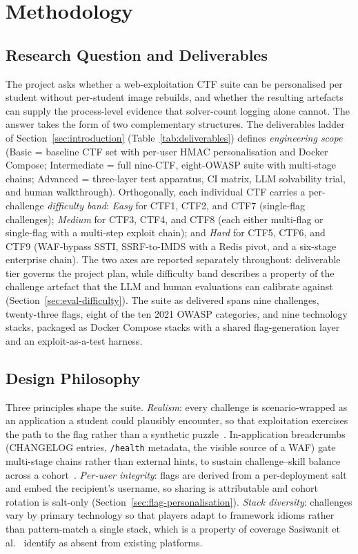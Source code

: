 \section{Methodology}
\label{sec:methodology}

\subsection{Research Question and Deliverables}
\label{sec:research-question}

The project asks whether a web-exploitation CTF suite can be
personalised per student without per-student image rebuilds,
and whether the resulting artefacts can supply the
process-level evidence that solver-count logging alone cannot.
The answer takes the form of two complementary structures.
The deliverables ladder of
Section~\ref{sec:introduction} (Table~\ref{tab:deliverables})
defines \emph{engineering
scope} (Basic = baseline CTF set with per-user HMAC
personalisation and Docker Compose; Intermediate = full
nine-CTF, eight-OWASP suite with multi-stage chains;
Advanced = three-layer test apparatus, CI matrix, LLM
solvability trial, and human walkthrough). Orthogonally,
each individual CTF carries a per-challenge
\emph{difficulty band}: \textit{Easy} for CTF1, CTF2, and
CTF7 (single-flag challenges); \textit{Medium} for CTF3,
CTF4, and CTF8 (each either multi-flag or single-flag with a
multi-step exploit chain); and
\textit{Hard} for CTF5, CTF6, and CTF9 (WAF-bypass SSTI,
SSRF-to-IMDS with a Redis pivot, and a six-stage enterprise
chain). The two axes are reported separately throughout:
deliverable tier governs the project plan, while difficulty
band describes a property of the challenge artefact that the
LLM and human evaluations can calibrate against
(Section~\ref{sec:eval-difficulty}). The suite as delivered
spans nine challenges, twenty-three flags, eight of the ten
2021 OWASP categories, and nine technology stacks, packaged
as Docker Compose stacks with a shared flag-generation layer
and an exploit-as-a-test harness.

\subsection{Design Philosophy}
\label{sec:design-philosophy}

Three principles shape the suite.
\textit{Realism}: every challenge is scenario-wrapped as an
application a student could plausibly encounter, so that
exploitation exercises the path to the flag rather than a
synthetic puzzle~\cite{Fuzyll2015,Vykopal}. In-application
breadcrumbs (CHANGELOG entries, \texttt{/health} metadata, the
visible source of a WAF) gate multi-stage chains rather than
external hints, to sustain challenge--skill balance across a
cohort~\cite{Csikszentmihalyi,Balaji2025}.
\textit{Per-user integrity}: flags are derived from a
per-deployment salt and embed the recipient's username, so
sharing is attributable and cohort rotation is salt-only
(Section~\ref{sec:flag-personalisation}).
\textit{Stack diversity}: challenges vary by primary
technology so that players adapt to framework idioms rather
than pattern-match a single stack, which is a property of
coverage Sasiwanit et al.~\cite{Sasiwanit} identify as absent
from existing platforms.

